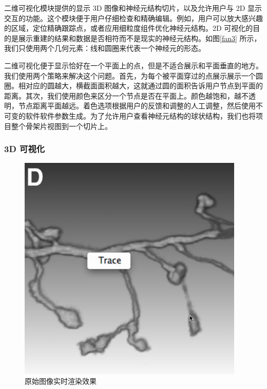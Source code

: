 {二维可视化模块提供的显示 3D 图像和神经元结构切片，以及允许用户与 2D 显示交互的功能。这个模块便于用户仔细检查和精确编辑。例如，用户可以放大感兴趣的区域，定位精确跟踪点，或者应用细粒度组件优化神经元结构。2D 可视化的目的是展示重建的结果和数据是否相符而不是现实的神经元结构。如图\ref{fan3} 所示，我们只使用两个几何元素：线和圆圈来代表一个神经元的形态。


二维可视化便于显示恰好在一个平面上的点，但是不适合展示和平面垂直的地方。我们使用两个策略来解决这个问题。首先，为每个被平面穿过的点展示展示一个圆圈。相对应的圆越大，横截面面积越大，这就通过圆的面积告诉用户节点到平面的距离。其次，我们使用颜色来区分一个节点是否在平面上。颜色越饱和，越不透明，节点距离平面越远。着色选项根据用户的反馈和调整的人工调整，然后使用不可变的软件软件参数生成。为了允许用户查看神经元结构的球状结构，我们也将项目整个骨架片视图到一个切片上。

\subsubsection{3D 可视化}
\begin{figure}
\centering
\includegraphics[width=108mm]{images/3d}
\caption{原始图像实时渲染效果}
\label{fan4}
\end{figure}

}
